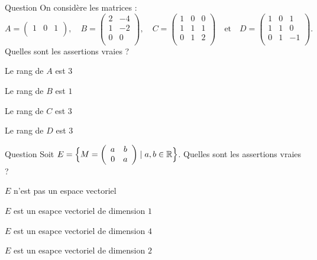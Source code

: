 \begin{multi}[multiple,feedback=
{Le rang d'une matrice est le nombre maximum de vecteurs colonnes ou lignes qui sont linéairement indépendants. Le rang de \(A\) est \(1\), le rang de \(B\) est \(1\), le rang de \(C\) est \(3\) et le rang de \(D\) est \(2\).
}]{Question}
On considère les matrices : 
\[A=  \left(\begin{array}{rcc}
1&0&1\\\end{array}\right),\quad B=  
\left(\begin{array}{rcc}2&-4\\
1&-2\\ 0&0\\
\end{array}\right),\quad C=  
\left(\begin{array}{rcc}1&0&0\\1&1&1\\ 0&1&2\\ 
\end{array}\right)\quad \mbox{et}\quad D=  
\left(\begin{array}{rcc}1&0&1\\1&1&0\\ 0&1&-1\\ 
\end{array}\right). \]
Quelles sont les assertions vraies ?

    \item Le rang de \(A\) est \(3\)
    \item* Le rang de \(B\) est \(1\)
    \item* Le rang de \(C\) est \(3\)
    \item Le rang de \(D\) est \(3\)
\end{multi}


\begin{multi}[multiple,feedback=
{On vérifie que \(E\) est un espace vectoriel et que \(\left\{\left(\begin{array}{rc}
1&0\\0&1\\ \end{array}\right), \; \left(\begin{array}{rc}
0&1\\0&0\\ \end{array}\right)\right \}\) est une base de \(E\). Donc \(\dim E = 2\).
}]{Question}
Soit \(E= \Big\{M=\left(\begin{array}{rc}
a&b\\0&a\\ \end{array}\right) \mid a,b \in \mathbb{R} \Big\}\). 
Quelles sont les assertions vraies ?

    \item \(E\) n'est pas un espace vectoriel
    \item \(E\) est un esapce vectoriel de dimension \(1\)
    \item \(E\) est un esapce vectoriel de dimension \( 4\)
    \item* \(E\) est un esapce vectoriel de dimension \( 2\)
\end{multi}


